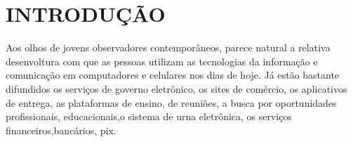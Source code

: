 \documentclass[
12pt,		%
openright,	%
twoside,  %
a4paper,			%
chapter=TITLE,		%
english,			%
french,				%
spanish,			%
brazil				%
]{USPSC-classe/USPSC}
\begin{document}






%




\listoffigures*
\cleardoublepage

\listoftables*
\cleardoublepage

\listofquadro*
\cleardoublepage




\tableofcontents*
\cleardoublepage
\textual

\chapter[INTRODU\c{C}\~AO]{INTRODU\c{C}\~AO}\label{INTRODU\c{C}\~AO}
Aos olhos de jovens observadores contempor\^aneos, parece natural a relativa desenvoltura com que as pessoas utilizam  as tecnologias da informa\c{c}\~ao e comunica\c{c}\~ao em computadores e celulares nos dias de hoje. J\'a est\~ao bastante difundidos os servi\c{c}os de governo eletr\^onico, os sites de com\'ercio, os  aplicativos de entrega, as plataformas de ensino, de reuni\~oes, a busca por oportunidades profissionais, educacionais,o sistema de urna eletr\^onica, os servi\c{c}os financeiros,banc\'arios, pix.
\end{document}
